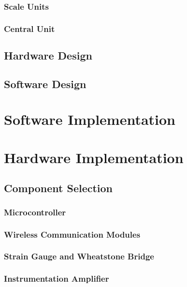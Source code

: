 \documentclass{l3proj}
\begin{document}
\subsection{Scale Units}
\label{scale}

\subsection{Central Unit}
\label{central}


\label{Block Diagram}
\section{Hardware Design}


\section{Software Design}

\chapter{Software Implementation}
\label{impl}

\chapter{Hardware Implementation}

\section{Component Selection}
\subsection{Microcontroller}

\subsection{Wireless Communication Modules}

\subsection{Strain Gauge and Wheatstone Bridge}


\subsection{Instrumentation Amplifier}
\label{ina}

\end{document}
